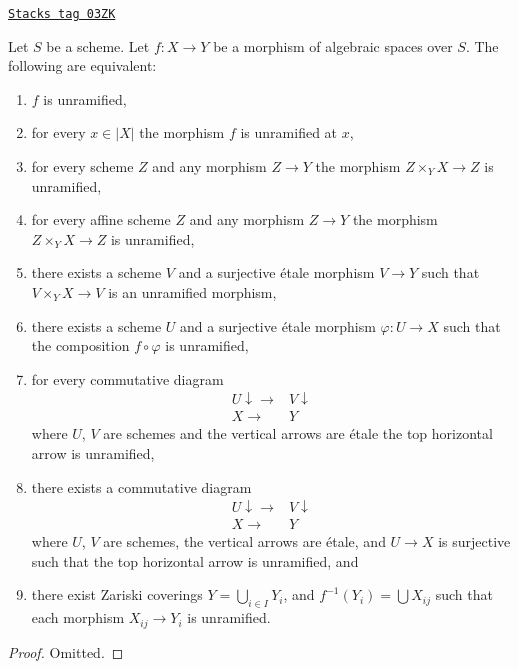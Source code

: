 \begin{lemma}
\label{spaces-morphisms-lemma-unramified-local}
\href{https://stacks.math.columbia.edu/tag/03ZK}{\texttt{Stacks tag 03ZK}}

Let $S$ be a scheme.
Let $f : X \to Y$ be a morphism of algebraic spaces over $S$.
The following are equivalent:
\begin{enumerate}
\item $f$ is unramified,
\item for every $x \in |X|$ the morphism $f$ is unramified at $x$,
\item for every scheme $Z$ and any morphism $Z \to Y$ the morphism
$Z \times_Y X \to Z$ is unramified,
\item for every affine scheme $Z$ and any morphism
$Z \to Y$ the morphism $Z \times_Y X \to Z$ is unramified,
\item there exists a scheme $V$ and a surjective \'etale morphism
$V \to Y$ such that $V \times_Y X \to V$ is an unramified morphism,
\item there exists a scheme $U$ and a surjective \'etale morphism
$\varphi : U \to X$ such that the composition $f \circ \varphi$
is unramified,
\item for every commutative diagram
$$
\begin{array}{cc}U \downarrow\longrightarrow & V \downarrow \\ X \longrightarrow & Y\end{array}
$$
where $U$, $V$ are schemes and the vertical arrows are \'etale
the top horizontal arrow is unramified,
\item there exists a commutative diagram
$$
\begin{array}{cc}U \downarrow\longrightarrow & V \downarrow \\ X \longrightarrow & Y\end{array}
$$
where $U$, $V$ are schemes, the vertical arrows are \'etale, and
$U \to X$ is surjective such that the top horizontal arrow is unramified, and
\item there exist Zariski coverings $Y = \bigcup_{i \in I} Y_i$,
and $f^{-1}(Y_i) = \bigcup X_{ij}$ such that
each morphism $X_{ij} \to Y_i$ is unramified.
\end{enumerate}
\end{lemma}

\begin{proof}
Omitted.
\end{proof}


